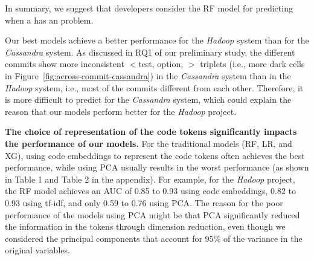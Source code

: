 In summary, we suggest that developers consider the RF model for predicting when a \instance has an \inconsistent problem. 

Our best models achieve a better performance for the \emph{Hadoop} system 
than for the \emph{Cassandra} system. %
As discussed in RQ1 of our preliminary study, the different commits show more inconsistent $<$test, option, \inconsistent$>$ triplets (i.e., more dark cells in Figure~\ref{fig:across-commit-cassandra}) in the \emph{Cassandra} system than in the \emph{Hadoop} system, i.e., most of the commits different from each other. Therefore, it is more difficult to predict \inconsistent for the \emph{Cassandra} system, which could explain the reason that our models perform better for the \emph{Hadoop} project. %

\noindent \textbf{The choice of representation of the code tokens significantly impacts the performance of our models.} For the traditional models (RF, LR, and XG), using code embeddings to represent the code tokens often achieves the best performance, while using PCA usually results in the worst performance (as shown in Table 1 and Table 2 in the appendix). For example, for the \emph{Hadoop} project, the RF model achieves an AUC of 0.85 to 0.93 using code embeddings, 0.82 to 0.93 using tf-idf, and only 0.59 to 0.76 using PCA. The reason for the poor performance of the models using PCA might be that PCA significantly reduced the information in the tokens through dimension reduction, even though we considered the principal components that account for 95\% of the variance in the original variables.

